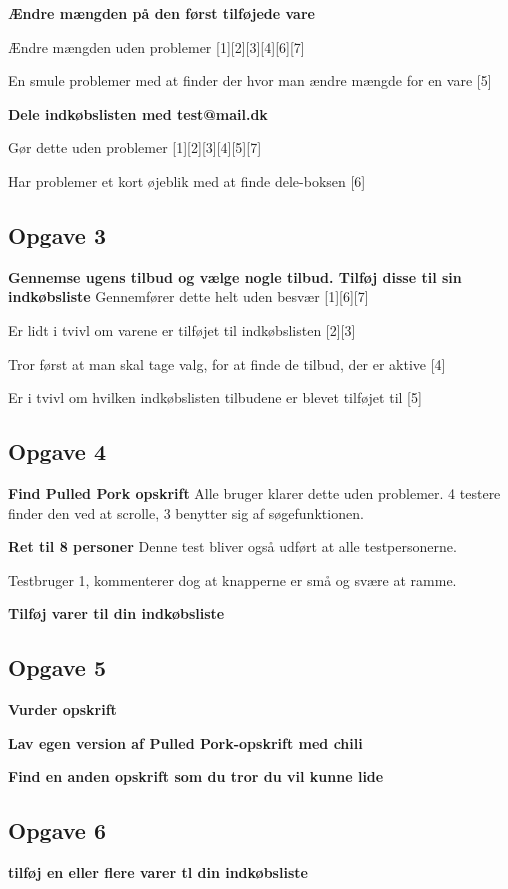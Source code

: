 \textbf{Ændre mængden på den først tilføjede vare}

Ændre mængden uden problemer [1][2][3][4][6][7]

En smule problemer med at finder der hvor man ændre mængde for en vare [5]

\textbf{Dele indkøbslisten med test@mail.dk}

Gør dette uden problemer [1][2][3][4][5][7]

Har problemer et kort øjeblik med at finde dele-boksen [6] 

\subsection{Opgave 3} 
\textbf{Gennemse ugens tilbud og vælge nogle tilbud. Tilføj disse til sin indkøbsliste}
Gennemfører dette helt uden besvær [1][6][7]

Er lidt i tvivl om varene er tilføjet til indkøbslisten [2][3]

Tror først at man skal tage valg, for at finde de tilbud, der er aktive [4]

Er i tvivl om hvilken indkøbslisten tilbudene er blevet tilføjet til [5]

\subsection{Opgave 4}
\textbf{Find Pulled Pork opskrift}
Alle bruger klarer dette uden problemer.
4 testere finder den ved at scrolle, 3 benytter sig af søgefunktionen.

\textbf{Ret til 8 personer}
Denne test bliver også udført at alle testpersonerne. 

Testbruger 1, kommenterer dog at knapperne er små og svære at ramme.

\textbf{Tilføj varer til din indkøbsliste}

\subsection{Opgave 5}
\textbf{Vurder opskrift}

\textbf{Lav egen version af Pulled Pork-opskrift med chili}

\textbf{Find en anden opskrift som du tror du vil kunne lide}

\subsection{Opgave 6}
\textbf{tilføj en eller flere varer tl din indkøbsliste}

